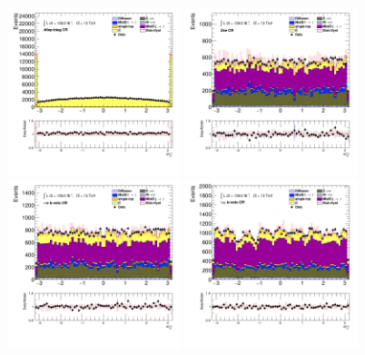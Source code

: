 		\begin{figure}[!htp]
			\begin{center}    
			\includegraphics[width=0.45\textwidth]{chapters/chapter6_HPlus/images/taulep/lep_0_phi_DILEP_BTAG.png}
			\includegraphics[width=0.45\textwidth]{chapters/chapter6_HPlus/images/taulep/lep_0_phi_ZEE.png} \\
			\includegraphics[width=0.45\textwidth]{chapters/chapter6_HPlus/images/taulep/lep_0_phi_TAUEL_BVETO.png} 
			\includegraphics[width=0.45\textwidth]{chapters/chapter6_HPlus/images/taulep/lep_0_phi_TAUMU_BVETO.png} \\

\end{center}
\end{figure}
